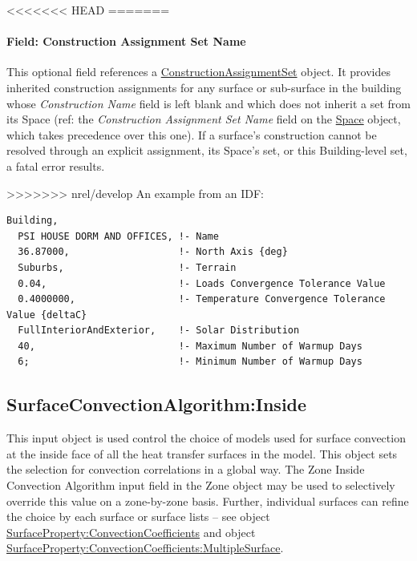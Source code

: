 <<<<<<< HEAD
=======
\paragraph{Field: Construction Assignment Set Name}\label{building-field-construction-assignment-set-name}

This optional field references a \hyperref[constructionassignmentset]{ConstructionAssignmentSet} object. It provides inherited construction assignments for any surface or sub-surface in the building whose \emph{Construction Name} field is left blank and which does not inherit a set from its Space (ref: the \emph{Construction Assignment Set Name} field on the \hyperref[space]{Space} object, which takes precedence over this one). If a surface's construction cannot be resolved through an explicit assignment, its Space's set, or this Building-level set, a fatal error results.

>>>>>>> nrel/develop
An example from an IDF:

\begin{lstlisting}
Building,
  PSI HOUSE DORM AND OFFICES, !- Name
  36.87000,                   !- North Axis {deg}
  Suburbs,                    !- Terrain
  0.04,                       !- Loads Convergence Tolerance Value
  0.4000000,                  !- Temperature Convergence Tolerance Value {deltaC}
  FullInteriorAndExterior,    !- Solar Distribution
  40,                         !- Maximum Number of Warmup Days
  6;                          !- Minimum Number of Warmup Days
\end{lstlisting}

\subsection{SurfaceConvectionAlgorithm:Inside}\label{surfaceconvectionalgorithminside}

This input object is used control the choice of models used for surface convection at the inside face of all the heat transfer surfaces in the model. This object sets the selection for convection correlations in a global way. The Zone Inside Convection Algorithm input field in the Zone object may be used to selectively override this value on a zone-by-zone basis. Further, individual surfaces can refine the choice by each surface or surface lists -- see object \hyperref[surfacepropertyconvectioncoefficients]{SurfaceProperty:ConvectionCoefficients} and object \hyperref[surfacepropertyconvectioncoefficientsmultiplesurface]{SurfaceProperty:ConvectionCoefficients:MultipleSurface}.

